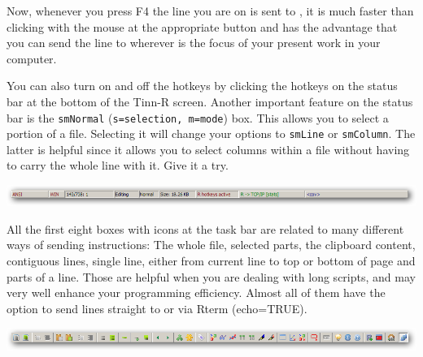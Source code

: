 Now, whenever you press F4 the line you are on is sent to \RR{},
it is much faster than clicking with the mouse at the appropriate button and has the advantage
that you can send the line to \RR{} wherever is the focus of your present work in your computer.

You can also turn on and off the hotkeys by clicking the hotkeys on the status bar at the bottom of the Tinn-R screen.
Another important feature on the status bar is the \texttt{smNormal} (\texttt{s=selection, m=mode}) box.
This allows you to select a portion of a file.
Selecting it will change your options to \texttt{smLine} or \texttt{smColumn}.
The latter is helpful since it allows you to select columns within a file without having to carry the whole line with it.
Give it a try.

\includegraphics[scale=0.50]{./res/secrets_statusbar.png}

All the first eight boxes with icons at the \RR{} task bar are related to many different ways of sending instructions:
The whole file, selected parts, the clipboard content, contiguous lines, single line, either from current line to top
or bottom of page and parts of a line. Those are helpful when you are dealing with long scripts,
and may very well enhance your programming efficiency.
Almost all of them have the option to send lines straight to \RR{} or via Rterm (echo=TRUE).

\includegraphics[scale=0.50]{./res/secrets_rtoolbar.png}
